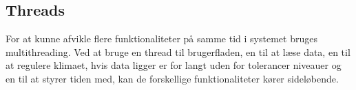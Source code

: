 
\subsection{Threads}
For at kunne afvikle flere funktionaliteter på samme tid i systemet bruges multithreading. Ved at bruge en thread til brugerfladen, en til at læse data, en til at regulere klimaet, hvis data ligger er for langt uden for tolerancer niveauer og en til at styrer tiden med, kan de forskellige funktionaliteter kører sideløbende.











